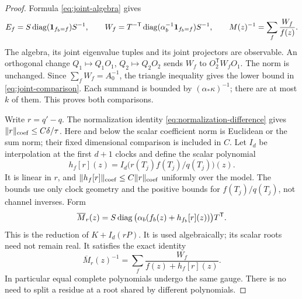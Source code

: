 \begin{proof}
Formula \eqref{eq:joint-algebra} gives
\begin{equation}\label{eq:resolved-inverse}
 E_f=S\operatorname{diag}(\mathbf1_{f_b=f})S^{-1},\qquad
 W_f=T^{-\mathsf T}\operatorname{diag}(\alpha_b^{-1}\mathbf1_{f_b=f})S^{-1},
 \qquad M(z)^{-1}=\sum_f\frac{W_f}{f(z)}.
\end{equation}
The algebra, its joint eigenvalue tuples and its joint projectors are
observable. An orthogonal change $Q_1\mapsto Q_1O_1$,
$Q_2\mapsto Q_2O_2$ sends $W_f$ to $O_2^{\mathsf T}W_fO_1$.
The norm is unchanged. Since $\sum_fW_f=A_0^{-1}$, the triangle
inequality gives the lower bound in \eqref{eq:joint-comparison}.
Each summand is bounded by $(\alpha_*\kappa)^{-1}$; there are at most
$k$ of them. This proves both comparisons.

Write $r=q'-q$. The normalization identity
\eqref{eq:normalization-difference} gives
$\|r\|_{\rm coef}\le C\delta/\tau$. Here and below the scalar
coefficient norm is Euclidean or the sum norm; their fixed dimensional
comparison is included in $C$. Let $I_d$ be interpolation at the first
$d+1$ clocks and define the scalar polynomial
\[
 h_f[r](z)=I_d\big(r(T_j)f(T_j)/q(T_j)\big)(z).
\]
It is linear in $r$, and $\|h_f[r]\|_{\rm coef}\le C\|r\|_{\rm coef}$
uniformly over the model. The bounds use only clock geometry and the
positive bounds for $f(T_j)/q(T_j)$, not channel inverses. Form
\begin{equation}\label{eq:polynomial-gauge}
 \overline M_r(z)=S\operatorname{diag}\big(\alpha_b(f_b(z)+h_{f_b}[r](z))\big)T^{\mathsf T}.
\end{equation}
This is the reduction of $K+I_d(rP)$. It is used algebraically; its
scalar roots need not remain real. It satisfies the exact identity
\begin{equation}\label{eq:gauge-resolved}
 \overline M_r(z)^{-1}=\sum_f\frac{W_f}{f(z)+h_f[r](z)}.
\end{equation}
In particular equal complete polynomials undergo the same gauge. There
is no need to split a residue at a root shared by different polynomials.


\end{proof}
